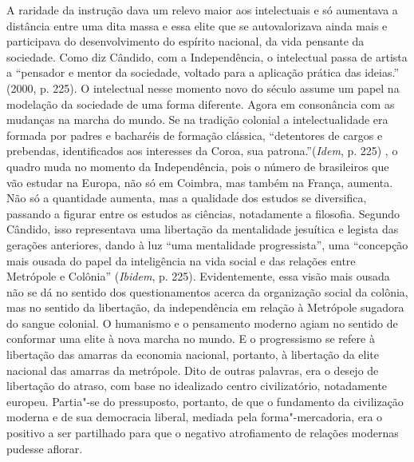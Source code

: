 A raridade da instrução dava um relevo maior aos intelectuais e só
aumentava a distância entre uma dita massa e essa elite que se
autovalorizava ainda mais e participava do desenvolvimento do espírito
nacional, da vida pensante da sociedade. Como diz Cândido, com a
Independência, o intelectual passa de artista a ``pensador e mentor da
sociedade, voltado para a aplicação prática das ideias.'' (2000, p.
225). O intelectual nesse momento novo do século  assume um
papel na modelação da sociedade de uma forma diferente. Agora em
consonância com as mudanças na marcha do mundo. Se na tradição colonial
a intelectualidade era formada por padres e bacharéis de formação
clássica, ``detentores de cargos e prebendas, identificados aos
interesses da Coroa, sua patrona.''(\emph{Idem}, p. 225) , o quadro muda
no momento da Independência, pois o número de brasileiros que vão
estudar na Europa, não só em Coimbra, mas também na França, aumenta. Não
só a quantidade aumenta, mas a qualidade dos estudos se diversifica,
passando a figurar entre os estudos as ciências, notadamente a
filosofia. Segundo Cândido, isso representava uma libertação da
mentalidade jesuítica e legista das gerações anteriores, dando à luz
``uma mentalidade progressista'', uma ``concepção mais ousada do papel
da inteligência na vida social e das relações entre Metrópole e
Colônia'' (\emph{Ibidem}, p. 225). Evidentemente, essa visão mais ousada
não se dá no sentido dos questionamentos acerca da organização social da
colônia, mas no sentido da libertação, da independência em relação à
Metrópole sugadora do sangue colonial. O humanismo e o pensamento
moderno agiam no sentido de conformar uma elite à nova marcha no mundo.
E o progressismo se refere à libertação das amarras da economia
nacional, portanto, à libertação da elite nacional das amarras da
metrópole. Dito de outras palavras, era o desejo de libertação do
atraso, com base no idealizado centro civilizatório, notadamente
europeu. Partia"-se do pressuposto, portanto, de que o fundamento da
civilização moderna e de sua democracia liberal, mediada pela
forma"-mercadoria, era o positivo a ser partilhado para que o negativo
atrofiamento de relações modernas pudesse aflorar.

